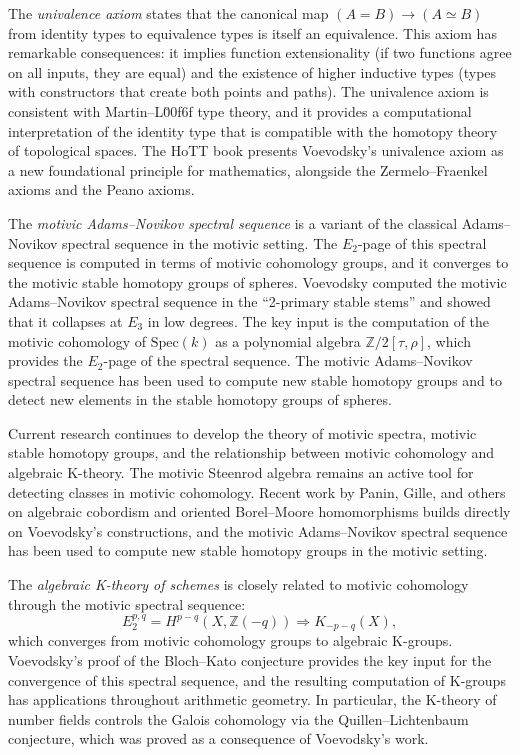The \emph{univalence axiom} states that the canonical map $(A = B) \to (A \simeq B)$ from identity types to equivalence types is itself an equivalence. This axiom has remarkable consequences: it implies function extensionality (if two functions agree on all inputs, they are equal) and the existence of higher inductive types (types with constructors that create both points and paths). The univalence axiom is consistent with Martin--L\u00f6f type theory, and it provides a computational interpretation of the identity type that is compatible with the homotopy theory of topological spaces. The HoTT book presents Voevodsky's univalence axiom as a new foundational principle for mathematics, alongside the Zermelo--Fraenkel axioms and the Peano axioms.

The \emph{motivic Adams--Novikov spectral sequence} is a variant of the classical Adams--Novikov spectral sequence in the motivic setting. The $E_2$-page of this spectral sequence is computed in terms of motivic cohomology groups, and it converges to the motivic stable homotopy groups of spheres. Voevodsky computed the motivic Adams--Novikov spectral sequence in the ``2-primary stable stems'' and showed that it collapses at $E_3$ in low degrees. The key input is the computation of the motivic cohomology of $\text{Spec}(k)$ as a polynomial algebra $\mathbb{Z}/2[\tau, \rho]$, which provides the $E_2$-page of the spectral sequence. The motivic Adams--Novikov spectral sequence has been used to compute new stable homotopy groups and to detect new elements in the stable homotopy groups of spheres.

Current research continues to develop the theory of motivic spectra, motivic stable homotopy groups, and the relationship between motivic cohomology and algebraic K-theory. The motivic Steenrod algebra remains an active tool for detecting classes in motivic cohomology. Recent work by Panin, Gille, and others on algebraic cobordism and oriented Borel--Moore homomorphisms builds directly on Voevodsky's constructions, and the motivic Adams--Novikov spectral sequence has been used to compute new stable homotopy groups in the motivic setting.

The \emph{algebraic K-theory of schemes} is closely related to motivic cohomology through the motivic spectral sequence:
\[
E_2^{p,q} = H^{p-q}(X, \mathbb{Z}(-q)) \Rightarrow K_{-p-q}(X),
\]
which converges from motivic cohomology groups to algebraic K-groups. Voevodsky's proof of the Bloch--Kato conjecture provides the key input for the convergence of this spectral sequence, and the resulting computation of K-groups has applications throughout arithmetic geometry. In particular, the K-theory of number fields controls the Galois cohomology via the Quillen--Lichtenbaum conjecture, which was proved as a consequence of Voevodsky's work.

